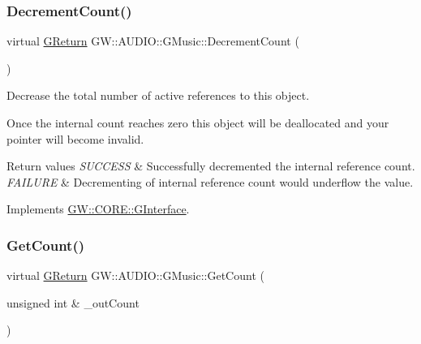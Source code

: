 \subsubsection{\texorpdfstring{Decrement\+Count()}{DecrementCount()}}
{\footnotesize\ttfamily virtual \mbox{\hyperlink{namespaceGW_a67a839e3df7ea8a5c5686613a7a3de21}{G\+Return}} G\+W\+::\+A\+U\+D\+I\+O\+::\+G\+Music\+::\+Decrement\+Count (\begin{DoxyParamCaption}{ }\end{DoxyParamCaption})\hspace{0.3cm}{\ttfamily [pure virtual]}}



Decrease the total number of active references to this object. 

Once the internal count reaches zero this object will be deallocated and your pointer will become invalid.


\begin{DoxyRetVals}{Return values}
{\em S\+U\+C\+C\+E\+SS} & Successfully decremented the internal reference count. \\
\hline
{\em F\+A\+I\+L\+U\+RE} & Decrementing of internal reference count would underflow the value. \\
\hline
\end{DoxyRetVals}


Implements \mbox{\hyperlink{classGW_1_1CORE_1_1GInterface_a19a368c77ad0aa7f49b5a4f772f173ba}{G\+W\+::\+C\+O\+R\+E\+::\+G\+Interface}}.

\mbox{\label{classGW_1_1AUDIO_1_1GMusic_ae41f54531b8325848215596fb2f821ac}} 
\subsubsection{\texorpdfstring{Get\+Count()}{GetCount()}}
{\footnotesize\ttfamily virtual \mbox{\hyperlink{namespaceGW_a67a839e3df7ea8a5c5686613a7a3de21}{G\+Return}} G\+W\+::\+A\+U\+D\+I\+O\+::\+G\+Music\+::\+Get\+Count (\begin{DoxyParamCaption}\item[{unsigned int \&}]{\+\_\+out\+Count }\end{DoxyParamCaption})\hspace{0.3cm}{\ttfamily [pure virtual]}}



